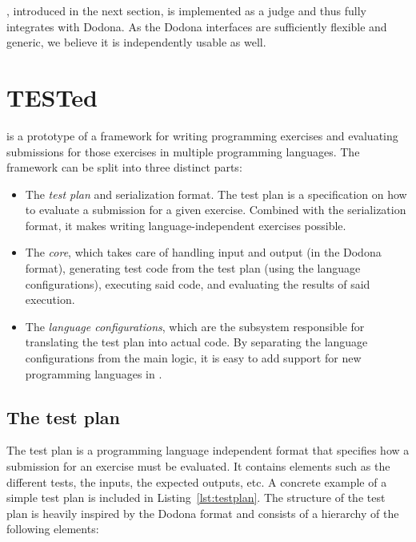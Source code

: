 \documentclass[5p,number]{elsarticle}
\begin{document}
    \tested{}, introduced in the next section, is implemented as a judge and thus fully integrates with Dodona.
    As the Dodona  interfaces are sufficiently flexible and generic, we believe it is independently usable as well.

    \section{TESTed}\label{sec:extended-test}

    \tested{} is a prototype of a framework for writing programming exercises and evaluating submissions for those exercises in multiple programming languages.
    The framework can be split into three distinct parts:

    \begin{itemize}
        \item The \emph{test plan} and serialization format.
        The test plan is a specification on how to evaluate a submission for a given exercise.
        Combined with the serialization format, it makes writing language-independent exercises possible.
        \item The \emph{core}, which takes care of handling input and output (in the Dodona  format), generating test code from the test plan (using the language configurations), executing said code, and evaluating the results of said execution.
        \item The \emph{language configurations}, which are the subsystem responsible for translating the test plan into actual code.
        By separating the language configurations from the main logic, it is easy to add support for new programming languages in \tested{}.
    \end{itemize}

    \subsection{The test plan}\label{subsec:the-test-plan}

    The test plan is a programming language independent format that specifies how a submission for an exercise must be evaluated.
    It contains elements such as the different tests, the inputs, the expected outputs, etc.
    A concrete example of a simple test plan is included in Listing~\ref{lst:testplan}.
    The structure of the test plan is heavily inspired by the Dodona  format and consists of a hierarchy of the following elements:
\end{document}
